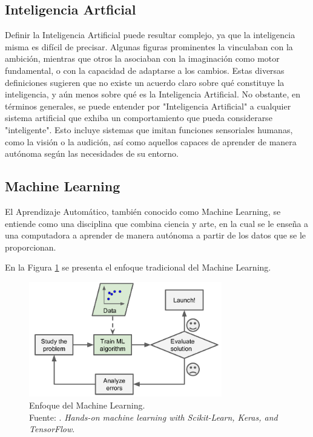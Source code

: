 \subsection{Inteligencia Artficial}
Definir la Inteligencia Artificial puede resultar complejo, ya que la inteligencia misma es difícil de precisar. Algunas figuras prominentes la vinculaban con la ambición, mientras que otros la asociaban con la imaginación como motor fundamental, o con la capacidad de adaptarse a los cambios. Estas diversas definiciones sugieren que no existe un acuerdo claro sobre qué constituye la inteligencia, y aún menos sobre qué es la Inteligencia Artificial. No obstante, en términos generales, se puede entender por "Inteligencia Artificial" a cualquier sistema artificial que exhiba un comportamiento que pueda considerarse "inteligente". Esto incluye sistemas que imitan funciones sensoriales humanas, como la visión o la audición, así como aquellos capaces de aprender de manera autónoma según las necesidades de su entorno. \parencite{bk_hurbans2020grokking}


\subsection{Machine Learning}
El Aprendizaje Automático, también conocido como Machine Learning, se entiende como una disciplina que combina ciencia y arte, en la cual se le enseña a una computadora a aprender de manera autónoma a partir de los datos que se le proporcionan. \parencite{bk_geron2022handml}

En la Figura \ref{2:fig209} se presenta el enfoque tradicional del Machine Learning.

\begin{figure}[H]
	\begin{center}
		\includegraphics[width=0.75\textwidth]{2/figures/enfoque_ml.png}
		\caption[Enfoque del Machine Learning]{Enfoque del Machine Learning. \\
		Fuente: \cite{bk_geron2022handml}. \textit{Hands-on machine learning with Scikit-Learn, Keras, and TensorFlow}.}
		\label{2:fig209}
	\end{center}
\end{figure}



